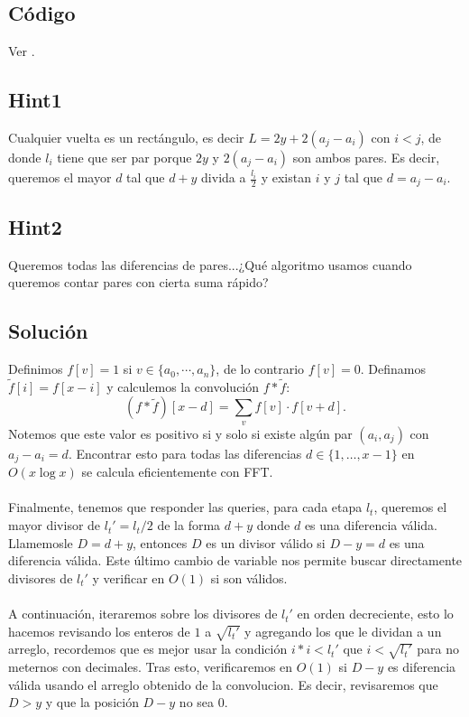 \subsection*{Código}
Ver .

\subsection*{Hint1}
Cualquier vuelta es un rectángulo, es decir $L=2y+2(a_j-a_i)$ con $i < j$, de donde $l_i$ tiene que ser par porque $2y$ y $2(a_j-a_i)$ son ambos pares. Es decir, queremos el mayor $d$ tal que $d+y$ divida a $\frac{l_i}{2}$ y existan $i$ y $j$ tal que $d=a_j-a_i$.
\subsection*{Hint2}
Queremos todas las diferencias de pares...¿Qué algoritmo usamos cuando queremos contar pares con cierta suma rápido?
\subsection*{Solución}
Definimos $f[v]=1$ si $v\in \{a_0, \cdots, a_n\}$, de lo contrario $f[v]=0$. Definamos $\tilde{f}[i]=f[x-i]$ y calculemos la convolución $f * \tilde{f}$:
\[
(f * \tilde{f})[x-d] = \sum_{v} f[v] \cdot f[v+d].
\]
Notemos que este valor es positivo si y solo si existe algún par $(a_i, a_j)$
con $a_j - a_i = d$. Encontrar esto para todas las diferencias $d \in \{1, \ldots, x-1\}$ en $O(x \log x)$ se calcula eficientemente con FFT.
\\\\
Finalmente, tenemos que responder las queries, para cada etapa $l_t$, queremos el mayor divisor de $l_t' = l_t/2$ de la forma $d + y$ donde $d$ es una diferencia válida. Llamemosle $D = d + y$, entonces $D$ es un divisor válido si $D-y=d$ es una diferencia válida. Este último cambio de variable nos permite buscar directamente divisores de $l_t'$ y verificar en $O(1)$ si son válidos.\\\\A continuación, iteraremos sobre los divisores de $l_t'$ en orden decreciente, esto lo hacemos revisando los enteros de $1$ a $\sqrt{l_t'}$ y agregando los que le dividan a un arreglo, recordemos que es mejor usar la condición $i*i<l_t'$ que $i<\sqrt{l_t'}$ para no meternos con decimales. Tras esto, verificaremos en $O(1)$ si $D - y$ es diferencia válida usando el arreglo obtenido de la convolucion. Es decir, revisaremos que $D>y$ y que la posición $D-y$ no sea $0$.
